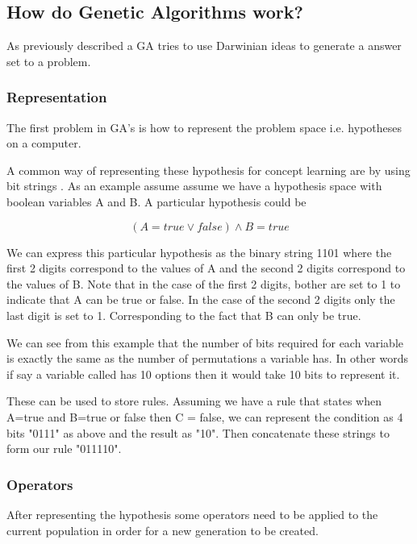 \documentclass[12pt,a4paper]{report}
\begin{document}
\subsection{How do Genetic Algorithms work?}

As previously described a GA tries to use Darwinian ideas to generate a answer set to a problem. 

\subsubsection{Representation}

The first problem in GA's is how to represent the problem space i.e. hypotheses on a computer. 

A common way of representing these hypothesis for concept learning are by using bit strings \citep{michell}. As an example assume assume we have a hypothesis space with boolean variables A and B. A particular hypothesis could be

\begin{equation}
(A = true \vee false) \wedge B = true
\end{equation}

We can express this particular hypothesis as the binary string 1101 where the first 2 digits correspond to the values of A and the second 2 digits correspond to the values of B. Note that in the case of the first 2 digits, bother are set to 1 to indicate that A can be true or false. In the case of the second 2 digits only the last digit is set to 1. Corresponding to the fact that B can only be true.  

We can see from this example that the number of bits required for each variable is exactly the same as the number of permutations a variable has. In other words if say a variable called has 10 options then it would take 10 bits to represent it.

These can be used to store rules. Assuming we have a rule that states when A=true and B=true or false then C = false, we can represent the condition as 4 bits "0111" as above and the result as "10". Then concatenate these strings to form our rule "011110".

\subsubsection{Operators}

After representing the hypothesis some operators need to be applied to the current population in order for a new generation to be created.
\end{document}
